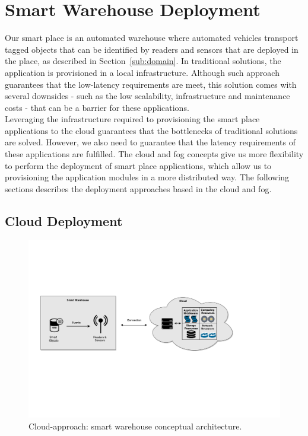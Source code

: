 \section{Smart Warehouse Deployment}
\label{sec:sol_smart_warehouse_deployment}
Our smart place is an automated warehouse where automated vehicles transport tagged objects that can
be identified by readers and sensors that are deployed in the place, as described in Section~\ref{sub:domain}.
In traditional solutions, the application is provisioned in a local infrastructure. Although such
approach guarantees that the low-latency requirements are meet, this solution comes with several
downsides - such as the low scalability, infrastructure and maintenance costs - that can be a barrier
for these applications.\\

Leveraging the infrastructure required to provisioning the smart place applications to the cloud
guarantees that the bottlenecks of traditional solutions are solved. However, we also need to
guarantee that the latency requirements of these applications are fulfilled. The cloud and fog concepts
give us more flexibility to perform the deployment of smart place applications, which allow us to
provisioning the application modules in a more distributed way. The following sections describes
the deployment approaches based in the cloud and fog.


\subsection{Cloud Deployment}
\label{sub:sol_cloud}

\begin{figure}[ht!]
  \centering
  \includegraphics[width=\textwidth]{./images/solution_cloud_architecture}
  \caption[Cloud-approach: conceptual architecture.]{Cloud-approach: smart warehouse conceptual architecture.}
  \label{fig:solution_cloud_architecture}
\end{figure}

